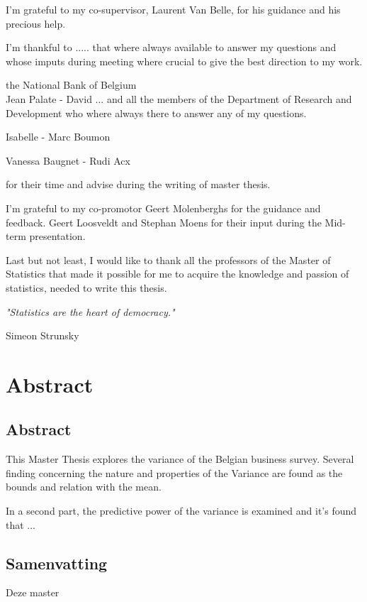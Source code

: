 \documentclass[12pt,a4paper,oneside]{book}
\newenvironment{bottompar}{\par\vspace*{\fill}}{\clearpage}
\begin{document}
I'm grateful to my co-supervisor, Laurent Van Belle, for his guidance and his precious help.

I'm thankful to ..... that where always available to answer my questions and whose imputs during meeting where crucial to give the best direction to my work.

the National Bank of Belgium \\

Jean Palate - David ... 
and all the members of the Department of Research and Development who where always there to answer any of my questions.

Isabelle - Marc Boumon

Vanessa Baugnet - Rudi Acx 

for their time and advise during the writing of master thesis. 

I'm grateful to my co-promotor Geert Molenberghs for the guidance and feedback. Geert Loosveldt and Stephan Moens for their input during the Mid-term presentation.

Last but not least, I would like to thank all the professors of the Master of Statistics that made it possible for me to acquire the knowledge and passion of statistics, needed to write this thesis.


\begin{bottompar}
\textit{"Statistics are the heart of democracy." }

    Simeon Strunsky
\end{bottompar}


\chapter*{Abstract}


\section*{Abstract}
This Master Thesis explores the variance of the Belgian business survey. 
Several finding concerning the nature and properties of the Variance are found as the bounds and relation with the mean.

In a second part, the predictive power of the variance is examined and it's found that ...


\section*{Samenvatting}

Deze master
\end{document}
